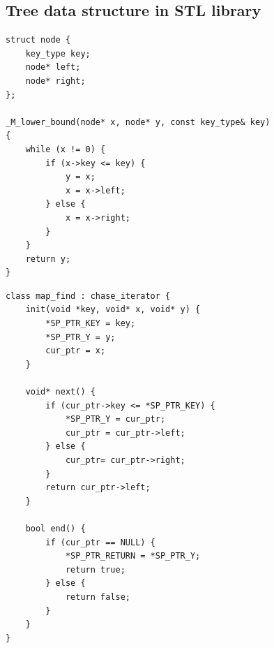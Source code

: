 \begin{minipage}{0.47\textwidth}
\subsection{Tree data structure in STL library}
\centering
\begin{lstlisting}[caption={C++ STL realization for \code{map::find()}},label={lst:map}, captionpos=t]
struct node {
    key_type key;
    node* left;
    node* right;
};

_M_lower_bound(node* x, node* y, const key_type& key)
{
    while (x != 0) {
        if (x->key <= key) {
            y = x; 
            x = x->left;
        } else {
            x = x->right;
        }
    }
    return y;
}
\end{lstlisting}

\begin{lstlisting}[caption={\name realization for \code{map::find()}},label={lst:map_mod}, captionpos=t]
class map_find : chase_iterator {
    init(void *key, void* x, void* y) {
        *SP_PTR_KEY = key;
        *SP_PTR_Y = y;
        cur_ptr = x;
    }
  
    void* next() {
        if (cur_ptr->key <= *SP_PTR_KEY) {
            *SP_PTR_Y = cur_ptr;  
            cur_ptr = cur_ptr->left;
        } else {
            cur_ptr= cur_ptr->right;
        }
        return cur_ptr->left;
    }
  
    bool end() {
        if (cur_ptr == NULL) {
            *SP_PTR_RETURN = *SP_PTR_Y;  
            return true;
        } else {
            return false;
        }
    }
}
\end{lstlisting}
\end{minipage}

